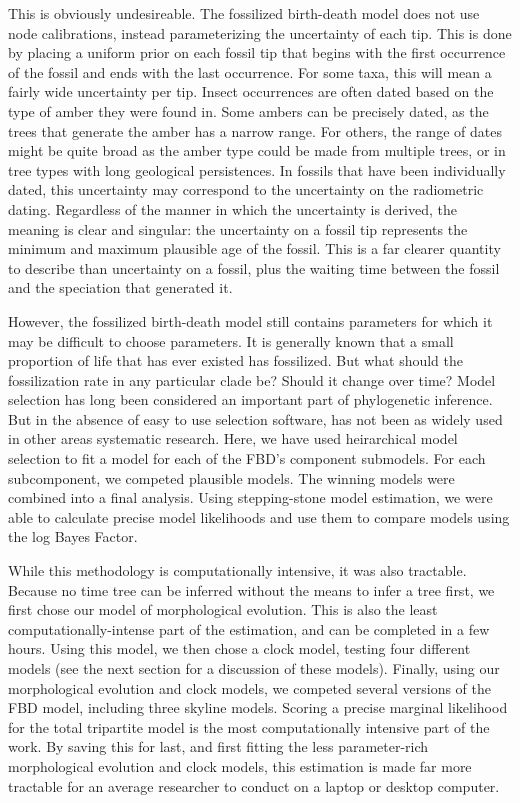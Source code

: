 \documentclass{article}
\begin{document}
This is obviously undesireable.
The fossilized birth-death model does not use node calibrations, instead parameterizing the uncertainty of each tip.
This is done by placing a uniform prior on each fossil tip that begins with the first occurrence of the fossil and ends with the last occurrence. 
For some taxa, this will mean a fairly wide uncertainty per tip.
Insect occurrences are often dated based on the type of amber they were found in.
Some ambers can be precisely dated, as the trees that generate the amber has a narrow range.
For others, the range of dates might be quite broad as the amber type could be made from multiple trees, or in tree types with long geological persistences. 
In fossils that have been individually dated, this uncertainty may correspond to the uncertainty on the radiometric dating.
Regardless of the manner in which the uncertainty is derived, the meaning is clear and singular: the uncertainty on a fossil tip represents the minimum and maximum plausible age of the fossil.
This is a far clearer quantity to describe than uncertainty on a fossil, plus the waiting time between the fossil and the speciation that generated it. 

However, the fossilized birth-death model still contains parameters for which it may be difficult to choose parameters.
It is generally known that a small proportion of life that has ever existed has fossilized. 
But what should the fossilization rate in any particular clade be?
Should it change over time? 
Model selection has long been considered an important part of phylogenetic inference.
But in the absence of easy to use selection software, has not been as widely used in other areas systematic research.
Here, we have used heirarchical model selection to fit a model for each of the FBD's component submodels.
For each subcomponent, we competed plausible models.
The winning models were combined into a final analysis.
Using stepping-stone model estimation, we were able to calculate precise model likelihoods and use them to compare models using the log Bayes Factor.

While this methodology is computationally intensive, it was also tractable. 
Because no time tree can be inferred without the means to infer a tree first, we first chose our model of morphological evolution.
This is also the least computationally-intense part of the estimation, and can be completed in a few hours.
Using this model, we then chose a clock model, testing four different models (see the next section for a discussion of these models).
Finally, using our morphological evolution and clock models, we competed several versions of the FBD model, including three skyline models.
Scoring a precise marginal likelihood for the total tripartite model is the most computationally intensive part of the work. 
By saving this for last, and first fitting the less parameter-rich morphological evolution and clock models, this estimation is made far more tractable for an average researcher to conduct on a laptop or desktop computer. 
\end{document}
